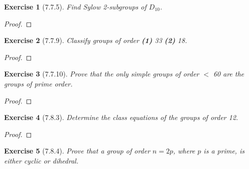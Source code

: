 \documentclass[12pt]{article}
\newtheorem*{exer}{Exercise}
\begin{document}

\begin{exer}[7.7.5]

    Find Sylow 2-subgroups of $D_{10}$.

\end{exer}

\begin{proof}

\end{proof}


\begin{exer}[7.7.9]

    Classify groups of order \textbf{(1)} 33 \textbf{(2)} 18.

\end{exer}

\begin{proof}

\end{proof}


\begin{exer}[7.7.10]

    Prove that the only simple groups of order $<$ 60 are the groups of
    prime order.

\end{exer}

\begin{proof}

\end{proof}


\begin{exer}[7.8.3]

    Determine the class equations of the groups of order 12.

\end{exer}

\begin{proof}

\end{proof}


\begin{exer}[7.8.4]

    Prove that a group of order $n = 2p$, where $p$ is a prime, is
    either cyclic or dihedral.

\end{exer}
\end{document}
